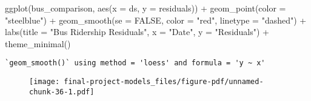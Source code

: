\documentclass[
  letterpaper,
  DIV=11,
  numbers=noendperiod]{scrartcl}
\newenvironment{Shaded}{\begin{snugshade}}{\end{snugshade}}
\newcommand{\AttributeTok}[1]{\textcolor[rgb]{0.40,0.45,0.13}{#1}}
\newcommand{\ConstantTok}[1]{\textcolor[rgb]{0.56,0.35,0.01}{#1}}
\newcommand{\FunctionTok}[1]{\textcolor[rgb]{0.28,0.35,0.67}{#1}}
\newcommand{\NormalTok}[1]{\textcolor[rgb]{0.00,0.23,0.31}{#1}}
\newcommand{\SpecialCharTok}[1]{\textcolor[rgb]{0.37,0.37,0.37}{#1}}
\newcommand{\StringTok}[1]{\textcolor[rgb]{0.13,0.47,0.30}{#1}}
\begin{document}
\begin{Shaded}
\begin{Highlighting}[]
\FunctionTok{ggplot}\NormalTok{(bus\_comparison, }\FunctionTok{aes}\NormalTok{(}\AttributeTok{x =}\NormalTok{ ds, }\AttributeTok{y =}\NormalTok{ residuals)) }\SpecialCharTok{+}
  \FunctionTok{geom\_point}\NormalTok{(}\AttributeTok{color =} \StringTok{"steelblue"}\NormalTok{) }\SpecialCharTok{+}
  \FunctionTok{geom\_smooth}\NormalTok{(}\AttributeTok{se =} \ConstantTok{FALSE}\NormalTok{, }\AttributeTok{color =} \StringTok{"red"}\NormalTok{, }\AttributeTok{linetype =} \StringTok{"dashed"}\NormalTok{) }\SpecialCharTok{+}
  \FunctionTok{labs}\NormalTok{(}\AttributeTok{title =} \StringTok{"Bus Ridership Residuals"}\NormalTok{,}
       \AttributeTok{x =} \StringTok{"Date"}\NormalTok{,}
       \AttributeTok{y =} \StringTok{"Residuals"}\NormalTok{) }\SpecialCharTok{+}
  \FunctionTok{theme\_minimal}\NormalTok{()}
\end{Highlighting}
\end{Shaded}

\begin{verbatim}
`geom_smooth()` using method = 'loess' and formula = 'y ~ x'
\end{verbatim}

\begin{figure}[H]

{\centering \texttt{[image: final-project-models\_files/figure-pdf/unnamed-chunk-36-1.pdf]}

}

\end{figure}
\end{document}
